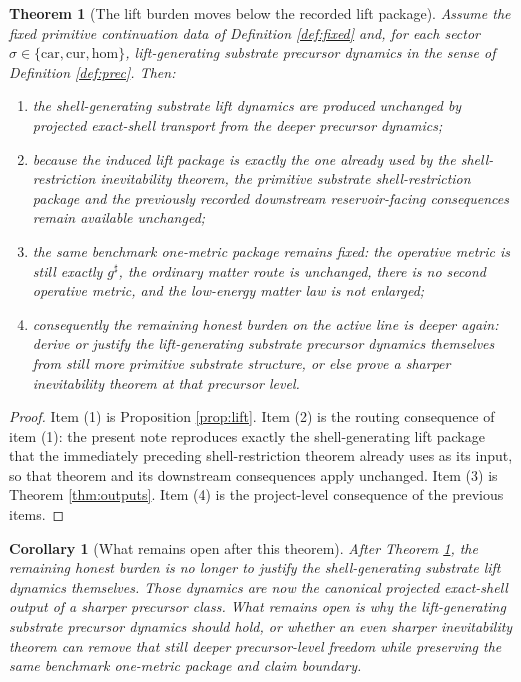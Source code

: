 \documentclass[11pt]{article}
\newcommand{\CompletedMetric}{g^{\sharp}}
\newcommand{\Car}{\mathrm{car}}
\newcommand{\Cur}{\mathrm{cur}}
\newcommand{\Hom}{\mathrm{hom}}
\newtheorem{corollary}{Corollary}
\newtheorem{theorem}{Theorem}
\begin{document}
\begin{theorem}[The lift burden moves below the recorded lift package]
\label{thm:main}
Assume the fixed primitive continuation data of Definition \ref{def:fixed} and, for each sector \(\sigma\in\{\Car,\Cur,\Hom\}\), lift-generating substrate precursor dynamics in the sense of Definition \ref{def:prec}. Then:
\begin{enumerate}
    \item the shell-generating substrate lift dynamics are produced unchanged by projected exact-shell transport from the deeper precursor dynamics;
    \item because the induced lift package is exactly the one already used by the shell-restriction inevitability theorem, the primitive substrate shell-restriction package and the previously recorded downstream reservoir-facing consequences remain available unchanged;
    \item the same benchmark one-metric package remains fixed: the operative metric is still exactly \(\CompletedMetric\), the ordinary matter route is unchanged, there is no second operative metric, and the low-energy matter law is not enlarged;
    \item consequently the remaining honest burden on the active line is deeper again: derive or justify the lift-generating substrate precursor dynamics themselves from still more primitive substrate structure, or else prove a sharper inevitability theorem at that precursor level.
\end{enumerate}
\end{theorem}

\begin{proof}
Item (1) is Proposition \ref{prop:lift}. Item (2) is the routing consequence of item (1): the present note reproduces exactly the shell-generating lift package that the immediately preceding shell-restriction theorem already uses as its input, so that theorem and its downstream consequences apply unchanged. Item (3) is Theorem \ref{thm:outputs}. Item (4) is the project-level consequence of the previous items.
\end{proof}

\begin{corollary}[What remains open after this theorem]
\label{cor:next}
After Theorem \ref{thm:main}, the remaining honest burden is no longer to justify the shell-generating substrate lift dynamics themselves. Those dynamics are now the canonical projected exact-shell output of a sharper precursor class. What remains open is why the lift-generating substrate precursor dynamics should hold, or whether an even sharper inevitability theorem can remove that still deeper precursor-level freedom while preserving the same benchmark one-metric package and claim boundary.
\end{corollary}
\end{document}
